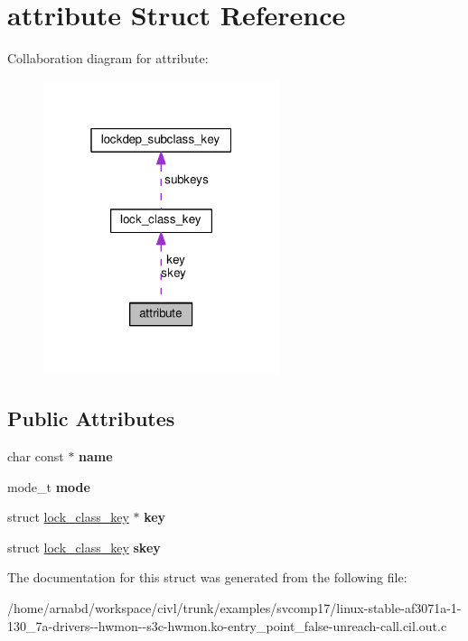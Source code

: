 \hypertarget{structattribute}{}\section{attribute Struct Reference}
\label{structattribute}


Collaboration diagram for attribute\+:
\nopagebreak
\begin{figure}[H]
\begin{center}
\leavevmode
\includegraphics[width=196pt]{structattribute__coll__graph}
\end{center}
\end{figure}
\subsection*{Public Attributes}
\begin{DoxyCompactItemize}
\item 
\hypertarget{structattribute_a4663b401eaed38f9f93a01ac6c4f7fdc}{}char const $\ast$ {\bfseries name}\label{structattribute_a4663b401eaed38f9f93a01ac6c4f7fdc}

\item 
\hypertarget{structattribute_a92e209379a605566072a47735351fc7d}{}mode\+\_\+t {\bfseries mode}\label{structattribute_a92e209379a605566072a47735351fc7d}

\item 
\hypertarget{structattribute_a11ffc967a2c4b25e353fb0174eb30988}{}struct \hyperlink{structlock__class__key}{lock\+\_\+class\+\_\+key} $\ast$ {\bfseries key}\label{structattribute_a11ffc967a2c4b25e353fb0174eb30988}

\item 
\hypertarget{structattribute_a979be9bd8ec05d0b3821b97eb7d53c04}{}struct \hyperlink{structlock__class__key}{lock\+\_\+class\+\_\+key} {\bfseries skey}\label{structattribute_a979be9bd8ec05d0b3821b97eb7d53c04}

\end{DoxyCompactItemize}


The documentation for this struct was generated from the following file\+:\begin{DoxyCompactItemize}
\item 
/home/arnabd/workspace/civl/trunk/examples/svcomp17/linux-\/stable-\/af3071a-\/1-\/130\+\_\+7a-\/drivers-\/-\/hwmon-\/-\/s3c-\/hwmon.\+ko-\/entry\+\_\+point\+\_\+false-\/unreach-\/call.\+cil.\+out.\+c\end{DoxyCompactItemize}
